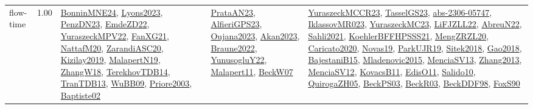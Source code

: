 {\begin{longtable}{p{3cm}r>{\raggedright\arraybackslash}p{6cm}>{\raggedright\arraybackslash}p{6cm}>{\raggedright\arraybackslash}p{8cm}}
\index{flow-time}\index{Concepts!flow-time}flow-time &  1.00 & \hyperref[detail:BonninMNE24]{BonninMNE24}, \hyperref[detail:Lyons2023]{Lyons2023}, \hyperref[detail:PenzDN23]{PenzDN23}, \hyperref[detail:EmdeZD22]{EmdeZD22}, \hyperref[detail:YuraszeckMPV22]{YuraszeckMPV22}, \hyperref[detail:FanXG21]{FanXG21}, \hyperref[detail:NattafM20]{NattafM20}, \hyperref[detail:ZarandiASC20]{ZarandiASC20}, \hyperref[detail:Kizilay2019]{Kizilay2019}, \hyperref[detail:MalapertN19]{MalapertN19}, \hyperref[detail:ZhangW18]{ZhangW18}, \hyperref[detail:TerekhovTDB14]{TerekhovTDB14}, \hyperref[detail:TranTDB13]{TranTDB13}, \hyperref[detail:WuBB09]{WuBB09}, \hyperref[detail:Priore2003]{Priore2003}, \hyperref[detail:Baptiste02]{Baptiste02} & \hyperref[detail:PrataAN23]{PrataAN23}, \hyperref[detail:AlfieriGPS23]{AlfieriGPS23}, \hyperref[detail:Oujana2023]{Oujana2023}, \hyperref[detail:Akan2023]{Akan2023}, \hyperref[detail:Braune2022]{Braune2022}, \hyperref[detail:YunusogluY22]{YunusogluY22}, \hyperref[detail:Malapert11]{Malapert11}, \hyperref[detail:BeckW07]{BeckW07} & \hyperref[detail:YuraszeckMCCR23]{YuraszeckMCCR23}, \hyperref[detail:TasselGS23]{TasselGS23}, \hyperref[detail:abs-2306-05747]{abs-2306-05747}, \hyperref[detail:IklassovMR023]{IklassovMR023}, \hyperref[detail:YuraszeckMC23]{YuraszeckMC23}, \hyperref[detail:LiFJZLL22]{LiFJZLL22}, \hyperref[detail:AbreuN22]{AbreuN22}, \hyperref[detail:Sahli2021]{Sahli2021}, \hyperref[detail:KoehlerBFFHPSSS21]{KoehlerBFFHPSSS21}, \hyperref[detail:MengZRZL20]{MengZRZL20}, \hyperref[detail:Caricato2020]{Caricato2020}, \hyperref[detail:Novas19]{Novas19}, \hyperref[detail:ParkUJR19]{ParkUJR19}, \hyperref[detail:Sitek2018]{Sitek2018}, \hyperref[detail:Gao2018]{Gao2018}, \hyperref[detail:BajestaniB15]{BajestaniB15}, \hyperref[detail:Mladenovic2015]{Mladenovic2015}, \hyperref[detail:MenciaSV13]{MenciaSV13}, \hyperref[detail:Zhang2013]{Zhang2013}, \hyperref[detail:MenciaSV12]{MenciaSV12}, \hyperref[detail:KovacsB11]{KovacsB11}, \hyperref[detail:EdisO11]{EdisO11}, \hyperref[detail:Salido10]{Salido10}, \hyperref[detail:QuirogaZH05]{QuirogaZH05}, \hyperref[detail:BeckPS03]{BeckPS03}, \hyperref[detail:BeckR03]{BeckR03}, \hyperref[detail:BeckDDF98]{BeckDDF98}, \hyperref[detail:FoxS90]{FoxS90}\\

\end{longtable}}
